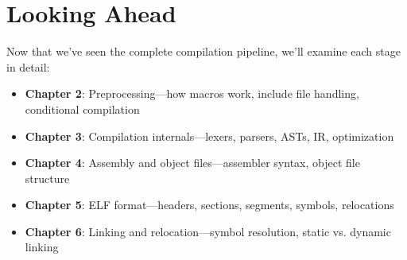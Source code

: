 \section{Looking Ahead}

Now that we've seen the complete compilation pipeline, we'll examine each stage in detail:

\begin{itemize}
    \item \textbf{Chapter 2}: Preprocessing—how macros work, include file handling, conditional compilation
    \item \textbf{Chapter 3}: Compilation internals—lexers, parsers, ASTs, IR, optimization
    \item \textbf{Chapter 4}: Assembly and object files—assembler syntax, object file structure
    \item \textbf{Chapter 5}: ELF format—headers, sections, segments, symbols, relocations
    \item \textbf{Chapter 6}: Linking and relocation—symbol resolution, static vs. dynamic linking
\end{itemize}
